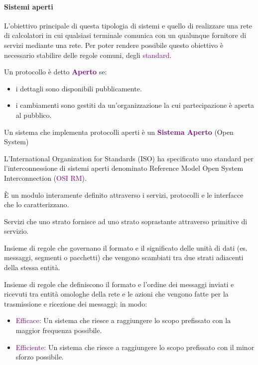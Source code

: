\paragraph{Sistemi aperti} L'obiettivo principale di questa tipologia di sistemi e quello di realizzare una rete di calcolatori in cui qualsiasi terminale comunica con un qualunque fornitore di servizi mediante una rete. \newline Per poter rendere possibile questo obiettivo è necessario stabilire delle regole comuni, degli \textcolor{purple}{standard}.

\begin{definition}
    Un protocollo è detto \textbf{\textcolor{purple}{Aperto}} se:
    \begin{itemize}
        \item i dettagli sono disponibili pubblicamente.
        \item i cambiamenti sono gestiti da un'organizzazione la cui partecipazione è aperta al pubblico.
    \end{itemize}
\end{definition}
\begin{definition}
    Un sistema che implementa protocolli aperti è un \textbf{\textcolor{purple}{Sistema Aperto}} (Open System)
\end{definition}

L’International Organization for Standards (ISO) ha specificato uno standard per l’interconnessione di sistemi aperti denominato Reference Model Open System Interconnection (\textcolor{purple}{OSI RM}).

\begin{definition}[Strato] 
    È un modulo interamente definito attraverso i servizi, protocolli e le interfacce che lo caratterizzano.
\end{definition}
\begin{definition}[Servizio]
    Servizi che uno strato fornisce ad uno strato soprastante attraverso primitive di servizio.
\end{definition}
\begin{definition}[Interfaccia]
    Insieme di regole che governano il formato e il significato delle unità di dati (es. messaggi, segmenti o pacchetti) che vengono scambiati tra due strati adiacenti della stessa entità.
\end{definition}
\begin{definition}[Protocollo]
    Insieme di regole che definiscono il formato e l’ordine dei messaggi inviati e ricevuti tra entità omologhe della rete e le azioni che vengono fatte per la trasmissione e ricezione dei messaggi; in modo:
    \begin{itemize}
        \item \textcolor{purple}{Efficace:} Un sistema che riesce a raggiungere lo scopo prefissato con la maggior frequenza possibile.
        \item \textcolor{purple}{Efficiente:} Un sistema che riesce a raggiungere lo scopo prefissato con il minor sforzo possibile.
    \end{itemize}
    
\end{definition}

